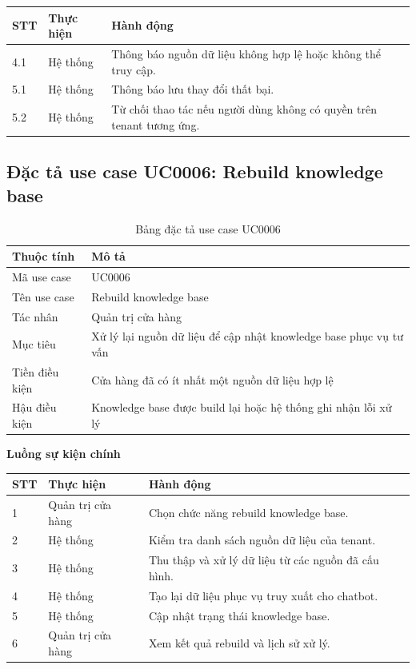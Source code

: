 \documentclass[../DoAn.tex]{subfiles}
\begin{document}
\begin{table}[H]
\centering
\begin{tabular}{|p{}|p{}|p{}|}
\hline
\textbf{STT} & \textbf{Thực hiện} & \textbf{Hành động} \\
\hline
4.1 & Hệ thống & Thông báo nguồn dữ liệu không hợp lệ hoặc không thể truy cập. \\
\hline
5.1 & Hệ thống & Thông báo lưu thay đổi thất bại. \\
\hline
5.2 & Hệ thống & Từ chối thao tác nếu người dùng không có quyền trên tenant tương ứng. \\
\hline
\end{tabular}
\end{table}

\subsection{Đặc tả use case UC0006: Rebuild knowledge base}
\label{subsection:2.3.3}

\begin{table}[H]
\centering
\caption{Bảng đặc tả use case UC0006}
\label{table:uc0006}
\begin{tabular}{|p{}|p{}|}
\hline
\textbf{Thuộc tính} & \textbf{Mô tả} \\
\hline
Mã use case & UC0006 \\
\hline
Tên use case & Rebuild knowledge base \\
\hline
Tác nhân & Quản trị cửa hàng \\
\hline
Mục tiêu & Xử lý lại nguồn dữ liệu để cập nhật knowledge base phục vụ tư vấn \\
\hline
Tiền điều kiện & Cửa hàng đã có ít nhất một nguồn dữ liệu hợp lệ \\
\hline
Hậu điều kiện & Knowledge base được build lại hoặc hệ thống ghi nhận lỗi xử lý \\
\hline
\end{tabular}
\end{table}

\textbf{Luồng sự kiện chính}

\begin{table}[H]
\centering
\begin{tabular}{|p{}|p{}|p{}|}
\hline
\textbf{STT} & \textbf{Thực hiện} & \textbf{Hành động} \\
\hline
1 & Quản trị cửa hàng & Chọn chức năng rebuild knowledge base. \\
\hline
2 & Hệ thống & Kiểm tra danh sách nguồn dữ liệu của tenant. \\
\hline
3 & Hệ thống & Thu thập và xử lý dữ liệu từ các nguồn đã cấu hình. \\
\hline
4 & Hệ thống & Tạo lại dữ liệu phục vụ truy xuất cho chatbot. \\
\hline
5 & Hệ thống & Cập nhật trạng thái knowledge base. \\
\hline
6 & Quản trị cửa hàng & Xem kết quả rebuild và lịch sử xử lý. \\
\hline
\end{tabular}
\end{table}
\end{document}
